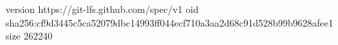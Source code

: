 version https://git-lfs.github.com/spec/v1
oid sha256:cf9d3445c5ca52079dbc14993ff044ecf710a3aa2d68c91d528b99b9628afee1
size 262240
